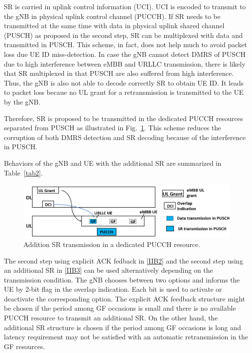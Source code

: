\documentclass{ieeeaccess}
\begin{document}
SR is carried in uplink control information (UCI). UCI is encoded to transmit to the gNB in physical uplink control channel (PUCCH). If SR needs to be transmitted at the same time with data in physical uplink shared channel (PUSCH) as proposed in the second step, SR can be multiplexed with data and transmitted in PUSCH. This scheme, in fact, does not help much to avoid packet loss due UE ID miss-detection. In case the gNB cannot detect DMRS of PUSCH due to high interference between eMBB and URLLC transmission, there is likely that SR multiplexed in that PUSCH are also suffered from high interference. Thus, the gNB is also not able to decode correctly SR to obtain UE ID. It leads to packet loss becaue no UL grant for a retransmission is transmitted to the UE by the gNB.

Therefore, SR is proposed to be transmitted in the dedicated PUCCH resources separated from PUSCH as illustrated in Fig.~\ref{fig3}. This scheme reduces the corruption of both DMRS detection and SR decoding because of the interference in PUSCH.

Behaviors of the gNB and UE with the additional SR are summarized in Table~\ref{tab2}.

\begin{figure}[htbp]
\centerline{\includegraphics[scale=0.35]{fig3.PNG}}
\caption{Addition SR transmission in a dedicated PUCCH resource.}
\label{fig3}
\vspace{-2mm}
\end{figure}


The second step using explicit ACK fedback in \ref{IIB2} and the second step using an additional SR in \ref{IIB3} can be used alternatively depending on the transmission condition. The gNB chooses between two options and informs the UE by 2-bit flag in the overlap indication. Each bit is used to activate or deactivate the corresponding option. The explicit ACK feedback structure might be chosen if the period among GF occasions is small and there is no available PUCCH resource to transmit an additional SR. On the other hand, the additional SR structure is chosen if the period among GF occasions is long and latency requirement may not be satisfied with an automatic retransmission in the GF resources. 
\end{document}
